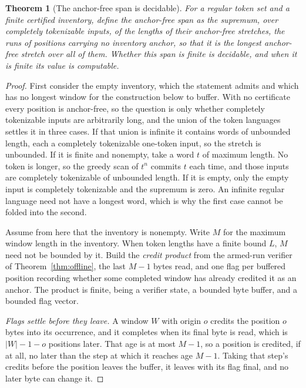 \documentclass[11pt,a4paper]{article}
\theoremstyle{definition}
\theoremstyle{plain}
\newtheorem{theorem}{Theorem}
\begin{document}
\begin{theorem}[The anchor-free span is decidable]\label{thm:density}
For a regular token set and a finite certified inventory, define the anchor-free span as the supremum, over completely
tokenizable inputs, of the lengths of their anchor-free stretches, the runs of positions carrying no inventory anchor,
so that it is the longest anchor-free stretch over all of them. Whether this span is finite is decidable, and when it is
finite its value is computable.
\end{theorem}

\begin{proof}
First consider the empty inventory, which the statement admits and which has no longest window for the construction
below to buffer. With no certificate every position is anchor-free, so the question is only whether completely
tokenizable inputs are arbitrarily long, and the union of the token languages settles it in three cases. If that union
is infinite it contains words of unbounded length, each a completely tokenizable one-token input, so the stretch is
unbounded. If it is finite and nonempty, take a word $t$ of maximum length. No token is longer, so the greedy scan of
$t^{n}$ commits $t$ each time, and those inputs are completely tokenizable of unbounded length. If it is empty, only the
empty input is completely tokenizable and the supremum is zero. An infinite regular language need not have a longest
word, which is why the first case cannot be folded into the second.

Assume from here that the inventory is nonempty. Write $M$ for the maximum window length in the inventory. When token
lengths have a finite bound $L$, $M$ need not be bounded by it. Build the \emph{credit product} from the armed-run
verifier of Theorem~\ref{thm:offline}, the last $M-1$ bytes read, and one flag per buffered position recording whether
some completed window has already credited it as an anchor. The product is finite, being a verifier state, a bounded
byte buffer, and a bounded flag vector.

\emph{Flags settle before they leave.} A window $W$ with origin $o$ credits the position $o$ bytes into its occurrence,
and it completes when its final byte is read, which is $|W| - 1 - o$ positions later. That age is at most $M - 1$, so a
position is credited, if at all, no later than the step at which it reaches age $M - 1$. Taking that step's credits
before the position leaves the buffer, it leaves with its flag final, and no later byte can change it.


\end{proof}
\end{document}
